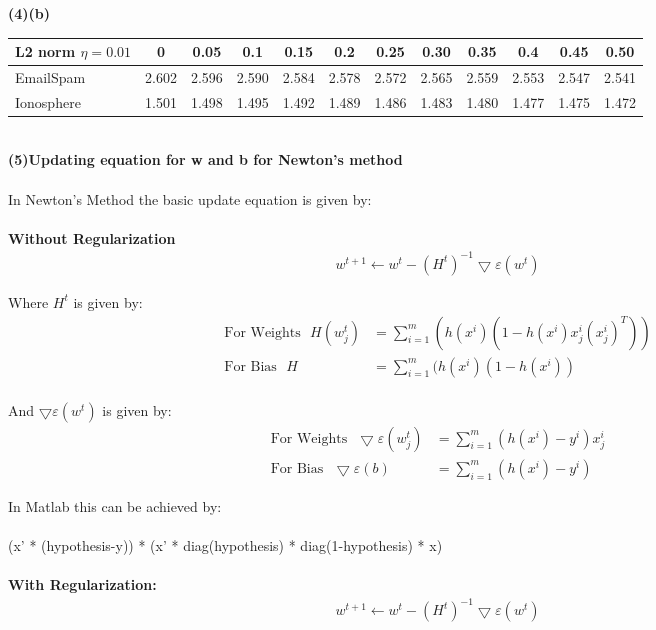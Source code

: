 \documentclass[paper=a4, fontsize=11pt]{scrartcl} %
\numberwithin{equation}{section} %
\numberwithin{figure}{section} %
\numberwithin{table}{section} %
\begin{document}
\textbf{(4)(b)}
\begin{tabular}{l*{11}{c}}
L2 norm $\eta=0.01$	& 0 & 0.05 & 0.1 & 0.15 & 0.2 & 0.25 & 0.30 & 0.35 & 0.4 & 0.45 & 0.50 \\
\hline
EmailSpam & 2.602 & 2.596 & 2.590 & 2.584 & 2.578 & 2.572 & 2.565 & 2.559 & 2.553 & 2.547 & 2.541\\
Ionosphere & 1.501 & 1.498 & 1.495 & 1.492 & 1.489 & 1.486 & 1.483 & 1.480 & 1.477 & 1.475 & 1.472
\end{tabular}\\



\textbf{(5)Updating equation for w and b for Newton's method}\\\\
In Newton's Method the basic update equation is given by:\\\\

\textbf{Without Regularization}
\begin{align*}
w^{t+1} \leftarrow w^{t} - (H^{t})^{-1}\bigtriangledown\varepsilon(w^{t})
\end{align*}

Where $H^{t}$ is given by:
\begin{align*}
\text{For Weights}~~~ H(w^{t}_{j}) &= \sum_{i=1}^{m}(h(x^{i})(1-h(x^{i})x^{i}_{j}(x^{i}_{j})^{T}))\\
\text{For Bias}~~~ H &= \sum_{i=1}^{m}(h(x^{i})(1-h(x^{i}))\\
\end{align*}

And $\bigtriangledown\varepsilon(w^{t})$ is given by:
\begin{align*}
\text{For Weights}~~~ \bigtriangledown\varepsilon(w^{t}_{j}) &= \sum_{i=1}^{m}(h(x^{i}) - y^{i})x^{i}_{j}\\
\text{For Bias}~~~ 
\bigtriangledown\varepsilon(b) &= \sum_{i=1}^{m}(h(x^{i}) - y^{i})
\end{align*}

In Matlab this can be achieved by:\\\\
(x' * (hypothesis-y)) * (x' * diag(hypothesis) * diag(1-hypothesis) * x)\\\\

\textbf{With Regularization:}
\begin{align*}
w^{t+1} \leftarrow w^{t} - (H^{t})^{-1}\bigtriangledown\varepsilon(w^{t})
\end{align*}
\end{document}
